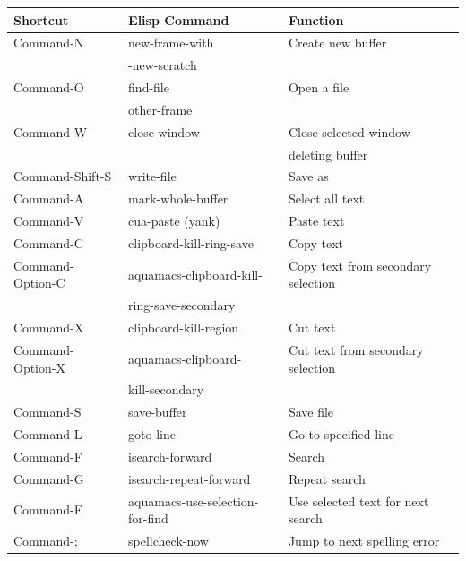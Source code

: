 \documentclass[11pt,letterpaper]{article}
\begin{document}
\begin{table}[thp]
\begin{center}
 \begin{tabular}{|l|l|l|}
\hline  \textbf{Shortcut} &  \textbf{Elisp Command} &   \textbf{Function}\\ 

\hline Command-N &new-frame-with & Create new buffer\\ &-new-scratch & \\

\hline Command-O & find-file & Open a file\\ & other-frame & \\
\hline  Command-W &  close-window & Close selected window \\ & & deleting buffer\\

\hline Command-Shift-S & write-file & Save as\\
 
\hline Command-A & mark-whole-buffer & Select all text\\

\hline Command-V & cua-paste (yank) & Paste text\\

\hline Command-C & clipboard-kill-ring-save & Copy text\\
\hline Command-Option-C & aquamacs-clipboard-kill- & Copy text
from secondary selection\\ & ring-save-secondary  &\\

\hline Command-X &  clipboard-kill-region & Cut text\\
\hline Command-Option-X & aquamacs-clipboard- & Cut text
from secondary selection\\ & kill-secondary &\\

\hline Command-S &  save-buffer & Save file\\

\hline Command-L &  goto-line & Go to specified line\\

\hline Command-F & isearch-forward & Search\\

\hline Command-G &  isearch-repeat-forward & Repeat search\\
\hline Command-E & aquamacs-use-selection-for-find & Use selected text for next search\\
\hline Command-; & spellcheck-now & Jump to next spelling error\\



\end{tabular}
\end{center}
\end{table}
\end{document}

